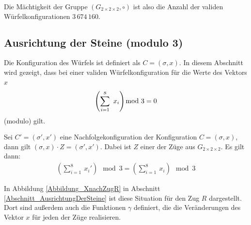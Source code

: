 \documentclass[12pt,a4paper, usenames, dvipsnames]{article}
\theoremstyle{mystyle}
\theoremstyle{definition}
\newcommand{\Gtwo}{\ensuremath{G_{2\times 2\times 2}}}
\begin{document}
Die Mächtigkeit der Gruppe $(\Gtwo,\circ)$ ist also die Anzahl der validen Würfelkonfigurationen $3\, 674\, 160$.



%
%
%
%
%
%
%
%
%
%
%
%
%
%
%
%
%
%
%
%
\subsection{Ausrichtung der Steine (modulo 3)}

\label{Abschnitt_Modulo3}

Die Konfiguration des Würfels ist definiert als $C=(\sigma, x)$. In diesem Abschnitt wird gezeigt, dass bei einer validen Würfelkonfiguration für die Werte des Vektors $x$ \begin{displaymath}
\left( \sum_{i= 1}^{8} \ x_i \right) \hspace*{-0.7em} \mod 3 = 0 
\end{displaymath}  (modulo) gilt. 

Sei $C'=(\sigma', x')$ eine Nachfolgekonfiguration der Konfiguration $C=(\sigma, x)$, dann gilt  ${(\sigma, x) \cdot Z = (\sigma', x')}$. Dabei ist $Z$ einer der Züge aus $\Gtwo$. Es gilt dann:
\begin{align*}
(\sum_{i= 1}^{8} \ x_i') \mod 3 = (\sum_{i= 1}^{8} \  x_i) \mod 3 
\end{align*}

In Abbildung \ref{Abbildung_XnachZugR} in Abschnitt \ref{Abschnitt_AusrichtungDerSteine} ist diese Situation für den Zug $R$ dargestellt. Dort sind außerdem auch die Funktionen $\gamma$ definiert, die die Veränderungen des Vektor $x$ für jeden der Züge realisieren. %

\end{document}
